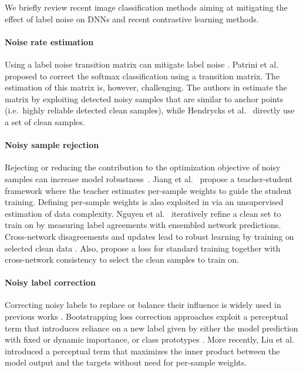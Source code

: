 \documentclass[final]{cvpr}
\begin{document}
We briefly review recent image classification methods aiming at mitigating the effect of label noise on DNNs and recent contrastive learning methods.

\paragraph*{Noise rate estimation}

Using a label noise transition matrix can mitigate label noise \cite{2017_CVPR_ForwardLoss,2018_NIPS_GoldLoss,2019_NeurIPS_AnchorPointsMatrix}. Patrini et al.~\cite{2017_CVPR_ForwardLoss} proposed to correct the softmax classification using a transition matrix. The estimation of this matrix is, however, challenging. The authors in \cite{2019_NeurIPS_AnchorPointsMatrix} estimate the matrix by exploiting detected noisy samples that are similar to anchor points (i.e.~highly reliable detected clean samples), while Hendrycks et al.~\cite{2018_NIPS_GoldLoss} directly use a set of clean samples.

\paragraph*{Noisy sample rejection}

Rejecting or reducing the contribution to the optimization objective of noisy samples can increase model robustness~\cite{2018_ICML_MentorNet,2018_ECCV_CurrNet,2018_CVPR_IterativeNoise,2020_ICML_DatasetOOD}. Jiang et al.~\cite{2018_ICML_MentorNet} propose a teacher-student framework where the teacher estimates per-sample weights to guide the student training. Defining per-sample weights is also exploited in \cite{2018_ECCV_CurrNet}
via an unsupervised estimation of data complexity. Nguyen et al.~\cite{2020_ICLR_SELF} iteratively refine a clean set to train on by measuring label agreements with ensembled network predictions. Cross-network disagreements and updates \cite{2018_NeurIPS_CoTeaching} lead to robust learning by training on selected clean data \cite{2019_ICML_CoTeachPlus}. Also, \cite{2020_CVPR_JoCoR} propose a loss for standard training together with cross-network consistency to select the clean samples to train on. 

\paragraph*{Noisy label correction}

Correcting noisy labels to replace or balance their influence is widely used in previous works \cite{2015_ICLR_Bootstrapping,2019_ICCV_PrototypesBootstrapping,2019_ICML_DynamicBootstrapping,2020_NeurIPS_EarlyReg}.
Bootstrapping loss \cite{2015_ICLR_Bootstrapping} correction approaches exploit a perceptual term that introduces reliance on a new label given by either the model prediction with fixed \cite{2015_ICLR_Bootstrapping} or dynamic \cite{2019_ICML_DynamicBootstrapping} importance, or class
prototypes \cite{2019_ICCV_PrototypesBootstrapping}. More recently, Liu et al.~\cite{2020_NeurIPS_EarlyReg} introduced a perceptual term that maximizes the inner product between the model output and the targets without need for per-sample weights.
\end{document}
